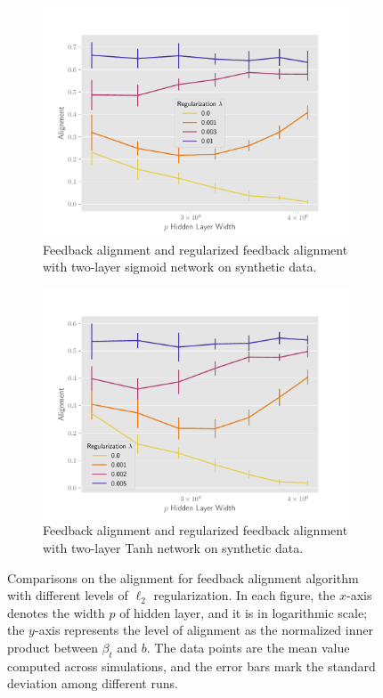 \begin{figure}[h]
\begin{subfigure}[b]{.49\textwidth}
\end{subfigure}
\medskip
\begin{subfigure}[b]{.49\textwidth}
  \centering
  \includegraphics[width=\linewidth]{figures/align_nn_sigmoid_autograd_l2_v4.pdf}
  \caption{Feedback alignment and regularized feedback alignment with two-layer sigmoid network on synthetic data.}
  \label{fig:align_nn_sigmoid_autograd_l2}
\end{subfigure}\hfill
\begin{subfigure}[b]{.49\textwidth}
  \centering
  \includegraphics[width=\linewidth]{figures/align_nn_tanh_autograd_l2_v4.pdf}
  \caption{Feedback alignment and regularized feedback alignment with two-layer Tanh network on synthetic data.}
  \label{fig:align_nn_tanh_autograd_l2}
\end{subfigure}
\caption{Comparisons on the alignment for feedback alignment algorithm with different levels of $\ell_2$ regularization. In each figure, the $x$-axis denotes the width $p$ of hidden layer, and it is in logarithmic scale; the $y$-axis represents the level of alignment as the normalized inner product between $\beta_t$ and $b$. The data points are the mean value computed across simulations, and the error bars mark the standard deviation among different runs.}
\label{fig:synthetic-l2}
\end{figure}

